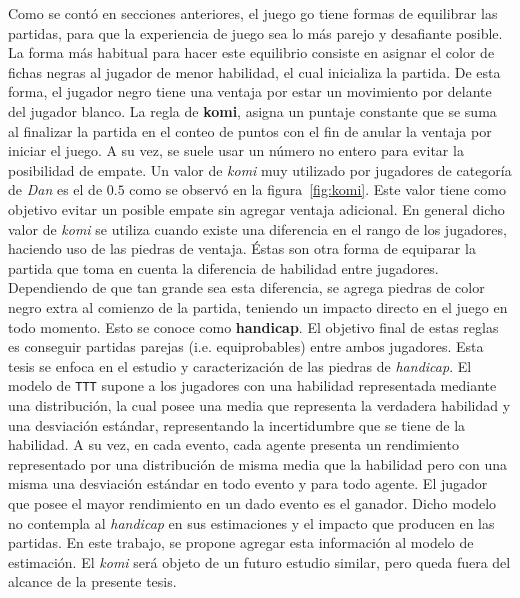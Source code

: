 \documentclass[11pt,twoside,spanish]{report} %
\begin{document}

Como se cont\'o en secciones anteriores, el juego go tiene formas de equilibrar las partidas, para que la experiencia de juego sea lo m\'as parejo y desafiante posible.
La forma m\'as habitual para hacer este equilibrio consiste en asignar el color de fichas negras al jugador de menor habilidad, el cual inicializa la partida.
De esta forma, el jugador negro tiene una ventaja por estar un movimiento por delante del jugador blanco.
La regla de \textbf{komi}, asigna un puntaje constante que se suma al finalizar la partida en el conteo de puntos con el fin de anular la ventaja por iniciar el juego.
A su vez, se suele usar un n\'umero no entero para evitar la posibilidad de empate.
Un valor de \emph{komi} muy utilizado por jugadores de categor\'ia de \textit{Dan} es el de $0.5$  como se observ\'o en la figura~\ref{fig:komi}.
Este valor tiene como objetivo evitar un posible empate sin agregar ventaja adicional.
En general dicho valor de \textit{komi} se utiliza cuando existe una diferencia en el rango de los jugadores, haciendo uso de las piedras de ventaja.
\'Estas son otra forma de equiparar la partida que toma en cuenta la diferencia de habilidad entre jugadores.
Dependiendo de que tan grande sea esta diferencia, se agrega piedras de color negro extra al comienzo de la partida, teniendo un impacto directo en el juego en todo momento. 
Esto se conoce como \textbf{handicap}.
El objetivo final de estas reglas es conseguir partidas parejas (i.e. equiprobables) entre ambos jugadores.
Esta tesis se enfoca en el estudio y caracterizaci\'on de las piedras de \textit{handicap}.
El modelo de \texttt{TTT} supone a los jugadores con una habilidad representada mediante una distribuci\'on, la cual posee una media que representa la verdadera habilidad y  una desviaci\'on est\'andar, representando la incertidumbre que se tiene de la habilidad.
A su vez, en cada evento, cada agente presenta un rendimiento representado por una distribuci\'on de misma media que la habilidad pero con una misma una desviaci\'on est\'andar en todo evento y para todo agente.
El jugador que posee el mayor rendimiento en un dado evento es el ganador.
Dicho modelo no contempla al \textit{handicap} en sus estimaciones y el impacto que producen en las partidas.
En este trabajo, se propone agregar esta informaci\'on al modelo de estimaci\'on.
El \textit{komi} ser\'a objeto de un futuro estudio similar, pero queda fuera del alcance de la presente tesis.
\end{document}
